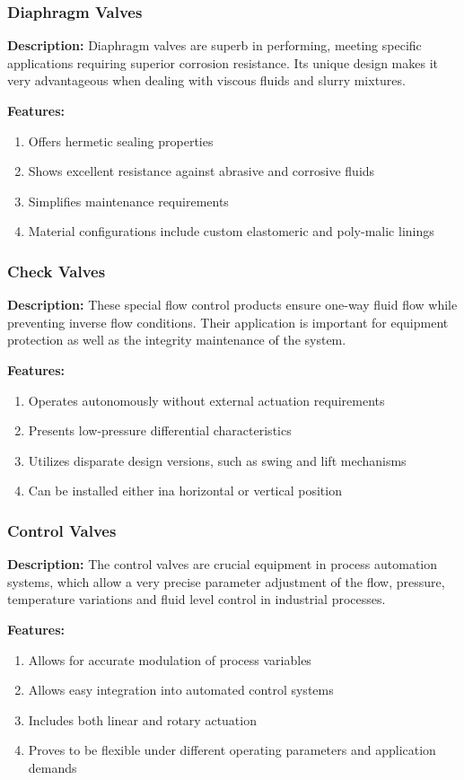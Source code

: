 \subsubsection{Diaphragm Valves}
\textbf{Description:} Diaphragm valves are superb in performing, meeting specific applications requiring superior corrosion resistance. Its unique design makes it very advantageous when dealing with viscous fluids and slurry mixtures.

\textbf{Features:}
\begin{enumerate}
    \item Offers hermetic sealing properties
    \item Shows excellent resistance against abrasive and corrosive fluids
    \item Simplifies maintenance requirements
    \item Material configurations include custom elastomeric and poly-malic linings
\end{enumerate}

\subsubsection{Check Valves}
\textbf{Description:} These special flow control products ensure one-way fluid flow while preventing inverse flow conditions. Their application is important for equipment protection as well as the integrity maintenance of the system.

\textbf{Features:}
\begin{enumerate}
    \item Operates autonomously without external actuation requirements
    \item Presents low-pressure differential characteristics
    \item Utilizes disparate design versions, such as swing and lift mechanisms
    \item Can be installed either ina  horizontal or vertical position
\end{enumerate}

\subsubsection{Control Valves}
\textbf{Description:} The control valves are crucial equipment in process automation systems, which allow a very precise parameter adjustment of the flow, pressure, temperature variations and fluid level control in industrial processes.

\textbf{Features:}
\begin{enumerate}
    \item Allows for accurate modulation of process variables
    \item Allows easy integration into automated control systems
    \item Includes both linear and rotary actuation
    \item Proves to be flexible under different operating parameters and application demands
\end{enumerate}